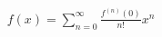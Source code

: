 \documentclass[preview]{standalone}
\begin{document}
\begin{align*}
f(x) = \sum_{n=0}^{\infty} \frac{f^{(n)}(0)}{n!} x^n
\end{align*}
\end{document}
